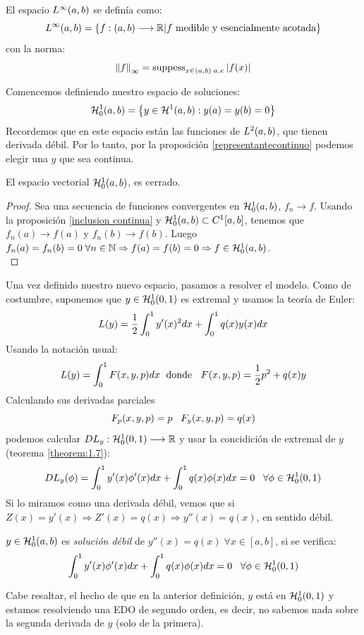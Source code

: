 \begin{remark}
El espacio $\lebesgue{\infty}$ se definía como:
\[
\lebesgue{\infty}=\{\funcion{f}{(a,b)}{\R}|f\text{ medible y esencialmente acotada}\}
\]
con la norma:
\[
\norm{f}_\infty = \suppess_{x\in(a,b)\;a.e}|f(x)|
\]
\end{remark}

Comencemos definiendo nuestro espacio de soluciones:
\[
\sobolevcero[a,b]{1}=\conjunto{y\in\sobolev{1}: y(a)=y(b)=0}
\]
Recordemos que en este espacio están las funciones de $\lebesgue{2}$, que tienen derivada débil. Por lo tanto, por la proposición \ref{representantecontinuo} podemos elegir una $y$ que sea continua.
\begin{prop}
El espacio vectorial $\sobolevcero{1}$, es cerrado.
\end{prop}   
\begin{proof}
Sea una secuencia de funciones convergentes en $\sobolevcero{1}$, $f_n\longrightarrow f$. Usando la proposición \ref{inclusion continua} y $\sobolevcero{1}\subset C^{1}[a,b]$, tenemos que $f_n(a)\longrightarrow f(a)$ y $f_n(b)\longrightarrow f(b)$. Luego $f_n(a)=f_n(b)=0 \;\forall n\in\N \Rightarrow f(a)=f(b)=0 \Rightarrow f\in\sobolevcero{1}$.\\
\end{proof}

Una vez definido nuestro nuevo espacio, pasamos a resolver el modelo. Como de costumbre, suponemos que $y\in\sobolevcero[0,1]{1}$ es extremal y usamos la teoría de Euler:
\[
L(y)=\frac{1}{2}\integral{0}{1}{y'(x)^2dx}+\integral{0}{1}{q(x)y(x)dx}
\]
Usando la notación usual:
\[
L(y)=\integral{0}{1}{F(x,y,p)dx} \; \text{ donde } \;\; F(x,y,p)=\frac{1}{2}p^2+q(x)y
\]
Calculando sus derivadas parciales
\[
F_p(x,y,p)=p \espacio F_y(x,y,p)=q(x)
\]
podemos calcular $\funcion{DL_y}{\sobolevcero[0,1]{1}}{\R}$ y usar la concidición de extremal de $y$ (teorema \ref{theorem:1.7}):
\[
DL_y(\phi)=\integral{0}{1}{y'(x)\phi'(x)dx}+\integral{0}{1}{q(x)\phi(x)dx}=0 \espacio \forall \phi\in\sobolevcero[0,1]{1}
\]
Si lo miramos como una derivada débil, vemos que si $Z(x)=y'(x) \Rightarrow Z'(x)=q(x) \Rightarrow y''(x)=q(x)$, en sentido débil.
\begin{definition}
\label{soluciondebil}
$y\in\sobolevcero{1}$ es \textit{solución débil} de $y''(x)=q(x) \; \forall x 
\in [a,b]$, si se verifica:
\[
\integral{0}{1}{y'(x)\phi'(x)dx}+\integral{0}{1}{q(x)\phi(x)dx}=0 \espacio \forall \phi\in\sobolevcero[0,1]{1}
\]
\end{definition}
Cabe resaltar, el hecho de que en la anterior definición, $y$ está en $\sobolevcero[0,1]{1}$ y estamos resolviendo una EDO de segundo orden, es decir, no sabemos nada sobre la segunda derivada de $y$ (solo de la primera).

